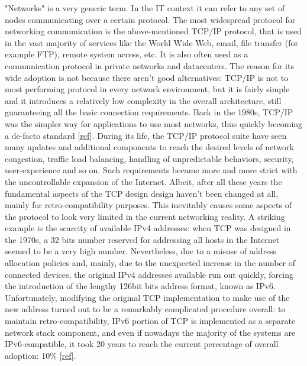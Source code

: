 "Networks" is a very generic term. In the IT context it can refer to any set of nodes communicating over a certain protocol. The most widespread protocol for networking communication is the above-mentioned TCP/IP protocol, that is used in the vast majority of services like the World Wide Web, email, file transfer (for example FTP), remote system access, etc. It is also often used as a communication protocol in private networks and datacenters. 
The reason for its wide adoption is not because there aren't good alternatives: TCP/IP is not to most performing protocol in every network environment, but it is fairly simple and it introduces a relatively low complexity in the overall architecture, still guaranteeing all the basic connection requirements. Back in the 1980s, TCP/IP was the simpler way for applications to use most networks, thus quickly becoming a de-facto standard [\href{http://www.computerworld.com/article/2593612/networking/tcp-ip.html}{ref}]. 
During its life, the TCP/IP protocol suite have seen many updates and additional components to reach the desired levels of network congestion, traffic load balancing, handling of unpredictable behaviors, security, user-experience and so on. Such requirements became more and more strict with the uncontrollable expansion of the Internet. Albeit, after all these years the fundamental aspects of the TCP design design haven't been changed at all, mainly for retro-compatibility purposes. This inevitably causes some aspects of the protocol to look very limited in the current networking reality. A striking example is the scarcity of available IPv4 addresses: when TCP was designed in the 1970s, a 32 bits number reserved for addressing all hosts in the Internet seemed to be a very high number. Nevertheless, due to a misuse of address allocation policies and, mainly, due to the unexpected increase in the number of connected devices, the original IPv4 addresses available run out quickly, forcing the introduction of the lengthy 126bit bits address format, known as IPv6. Unfortunately, modifying the original TCP implementation to make use of the new address turned out to be a remarkably complicated procedure overall: to maintain retro-compatibility, IPv6 portion of TCP is implemented as a separate network stack component, and even if nowadays the majority of the systems are IPv6-compatible, it took 20 years to reach the current percentage of overall adoption: 10\% [\href{http://www.google.com/intl/en/ipv6/statistics.html#tab=ipv6-adoption&tab=ipv6-adoption}{ref}].

